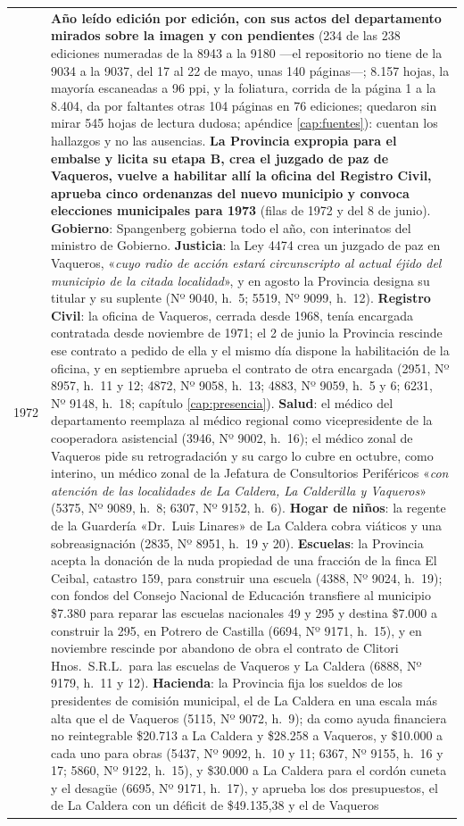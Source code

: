 \begin{longtable}{@{}p{2.7cm}p{10.3cm}@{}}
1972 & \textbf{Año leído edición por edición, con sus actos del departamento mirados sobre la imagen y con pendientes} (234 de las 238 ediciones numeradas de la 8943 a la 9180 ---el repositorio no tiene de la 9034 a la 9037, del 17 al 22 de mayo, unas 140 páginas---; 8.157 hojas, la mayoría escaneadas a 96 ppi, y la foliatura, corrida de la página 1 a la 8.404, da por faltantes otras 104 páginas en 76 ediciones; quedaron sin mirar 545 hojas de lectura dudosa; apéndice \ref{cap:fuentes}): cuentan los hallazgos y no las ausencias. \textbf{La Provincia expropia para el embalse y licita su etapa B, crea el juzgado de paz de Vaqueros, vuelve a habilitar allí la oficina del Registro Civil, aprueba cinco ordenanzas del nuevo municipio y convoca elecciones municipales para 1973} (filas de 1972 y del 8 de junio). \textbf{Gobierno}: Spangenberg gobierna todo el año, con interinatos del ministro de Gobierno. \textbf{Justicia}: la Ley 4474 crea un juzgado de paz en Vaqueros, «\textit{cuyo radio de acción estará circunscripto al actual éjido del municipio de la citada localidad}», y en agosto la Provincia designa su titular y su suplente (Nº 9040, h.\ 5; 5519, Nº 9099, h.\ 12). \textbf{Registro Civil}: la oficina de Vaqueros, cerrada desde 1968, tenía encargada contratada desde noviembre de 1971; el 2 de junio la Provincia rescinde ese contrato a pedido de ella y el mismo día dispone la habilitación de la oficina, y en septiembre aprueba el contrato de otra encargada (2951, Nº 8957, h.\ 11 y 12; 4872, Nº 9058, h.\ 13; 4883, Nº 9059, h.\ 5 y 6; 6231, Nº 9148, h.\ 18; capítulo \ref{cap:presencia}). \textbf{Salud}: el médico del departamento reemplaza al médico regional como vicepresidente de la cooperadora asistencial (3946, Nº 9002, h.\ 16); el médico zonal de Vaqueros pide su retrogradación y su cargo lo cubre en octubre, como interino, un médico zonal de la Jefatura de Consultorios Periféricos «\textit{con atención de las localidades de La Caldera, La Calderilla y Vaqueros}» (5375, Nº 9089, h.\ 8; 6307, Nº 9152, h.\ 6). \textbf{Hogar de niños}: la regente de la Guardería «Dr.\ Luis Linares» de La Caldera cobra viáticos y una sobreasignación (2835, Nº 8951, h.\ 19 y 20). \textbf{Escuelas}: la Provincia acepta la donación de la nuda propiedad de una fracción de la finca El Ceibal, catastro 159, para construir una escuela (4388, Nº 9024, h.\ 19); con fondos del Consejo Nacional de Educación transfiere al municipio \$7.380 para reparar las escuelas nacionales 49 y 295 y destina \$7.000 a construir la 295, en Potrero de Castilla (6694, Nº 9171, h.\ 15), y en noviembre rescinde por abandono de obra el contrato de Clitori Hnos.\ S.R.L.\ para las escuelas de Vaqueros y La Caldera (6888, Nº 9179, h.\ 11 y 12). \textbf{Hacienda}: la Provincia fija los sueldos de los presidentes de comisión municipal, el de La Caldera en una escala más alta que el de Vaqueros (5115, Nº 9072, h.\ 9); da como ayuda financiera no reintegrable \$20.713 a La Caldera y \$28.258 a Vaqueros, y \$10.000 a cada uno para obras (5437, Nº 9092, h.\ 10 y 11; 6367, Nº 9155, h.\ 16 y 17; 5860, Nº 9122, h.\ 15), y \$30.000 a La Caldera para el cordón cuneta y el desagüe (6695, Nº 9171, h.\ 17), y aprueba los dos presupuestos, el de La Caldera con un déficit de \$49.135,38 y el de Vaqueros 
\end{longtable}
